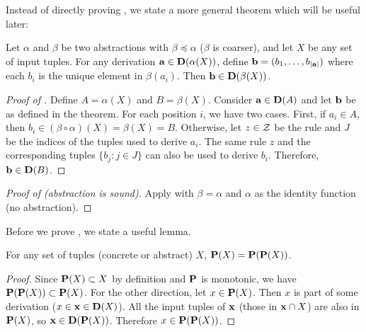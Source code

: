 \appendix
{}

Instead of directly proving , we state a more general
theorem which will be useful later:

\begin{theorem}[Soundness]
\label{thm:soundness}
Let $\alpha$ and $\beta$ be two abstractions with $\beta \preceq \alpha$ ($\beta$ is coarser),
and let $X$ be any set of input tuples.
For any derivation $\mathbf{a} \in \mathbf{D}(\alpha(X))$,
define $\mathbf{b} = (b_1, \dots, b_{|\mathbf{a}|})$ where each $b_i$ is the unique element in $\beta(a_i)$.
Then $\mathbf{b} \in \mathbf{D}(\beta(X))$.
\end{theorem}
\begin{proof}[Proof of ]
Define $A=\alpha(X)$ and $B=\beta(X)$.
Consider $\mathbf{a} \in \mathbf{D}(A)$ and let $\mathbf{b}$ be as defined in the theorem.
For each position $i$,
we have two cases.
First, if $a_i \in A$, then $b_i \in (\beta \circ \alpha)(X) = \beta(X) = B$.
Otherwise, let $z \in \mathcal{Z}$ be the rule and $J$ be the indices of the tuples used to derive $a_i$.
The same rule $z$ and the corresponding tuples $\{ b_j : j \in J \}$ can also be used to derive $b_i$.
Therefore, $\mathbf{b} \in \mathbf{D}(B)$.
\end{proof}

\begin{proof}[Proof of  (abstraction is sound)]
Apply  with $\beta = \alpha$ and $\alpha$ as the identity function (no abstraction).
\end{proof}


Before we prove , we state a useful lemma.
\begin{lemma}
\label{lem:Pidem}
For any set of tuples (concrete or abstract) $X$, $\mathbf{P}(X) = \mathbf{P}(\mathbf{P}(X))$.
\end{lemma}
\begin{proof}[Proof]
Since $\mathbf{P}(X) \subset X$ by definition and $\mathbf{P}$ is monotonic,
we have $\mathbf{P}(\mathbf{P}(X)) \subset \mathbf{P}(X)$.
For the other direction, let $x \in \mathbf{P}(X)$.
Then $x$ is part of some derivation ($x \in \mathbf{x} \in \mathbf{D}(X)$).
All the input tuples of $\mathbf{x}$ (those in $\mathbf{x}\cap X$) are also in $\mathbf{P}(X)$,
so $\mathbf{x} \in \mathbf{D}(\mathbf{P}(X))$.  Therefore $x \in \mathbf{P}(\mathbf{P}(X))$.
\end{proof}

